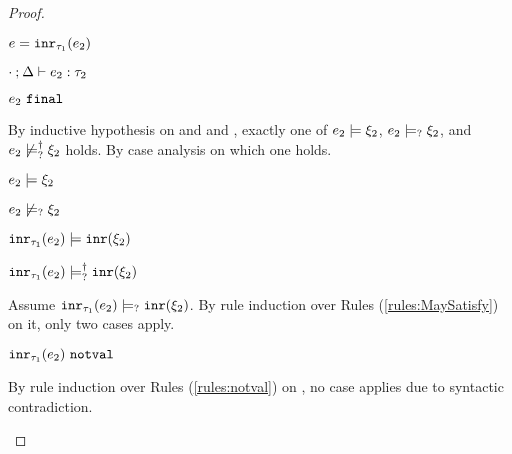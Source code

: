 \begin{proof}
\begin{byCases}
\begin{byCases}
    \item[\text{(\ref{rule:TInr})}]
        \begin{pfsteps*}
        \item $e=\mathtt{inr}_{\tau_1}({e_2})$ 
        \item $\cdot \mathbin{;} \Delta \vdash e_2 : \tau_2$  
        \item $e_2 ~\mathtt{final}$  
        \end{pfsteps*}
        By inductive hypothesis on  and  and , exactly one of $e_2 \models \xi_2$, $e_2 \models_{?} \xi_2$, and $e_2 \not\models_{?}^{\dag} \xi_2$ holds. By case analysis on which one holds.
        \begin{byCases}
        \item[\csatisfy{e_2}{\xi_2}]
            \begin{pfsteps*}
            \item $e_2 \models \xi_2$  
            \item $e_2 \not\models_{?} \xi_2$  
            \item $\mathtt{inr}_{\tau_1}({e_2}) \models \mathtt{inr}(\xi_2)$  
            \item $\mathtt{inr}_{\tau_1}({e_2}) \models_{?}^{\dag} \mathtt{inr}(\xi_2)$ 
            \end{pfsteps*}
            Assume $\mathtt{inr}_{\tau_1}({e_2}) \models_{?} \mathtt{inr}(\xi_2)$. By rule induction over Rules (\ref{rules:MaySatisfy}) on it, only two cases apply.
            \begin{byCases}
            \item[\text{(\ref{rule:CMSNotVal})}]
                \begin{pfsteps*}
                \item $\mathtt{inr}_{\tau_1}({e_2}) ~\mathtt{notval}$  
                \end{pfsteps*}
                By rule induction over Rules (\ref{rules:notval}) on , no case applies due to syntactic contradiction.
            \item[\text{(\ref{rule:CMSInr})}]

\end{byCases}
\end{byCases}
\end{byCases}
\end{byCases}
\end{proof}
